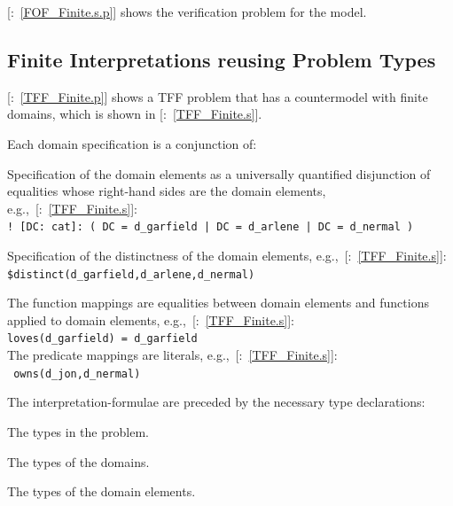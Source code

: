 \documentclass{ceurart}
\newcommand{\smalltt}[1]{\small \texttt{#1}}
\newcommand{\example}{{\scriptsize \faFile[regular]}}
\newcommand{\tildenot}{\raisebox{0.4ex}{\texttildelow}}
\newenvironment{packed_itemize}{
\vspace*{-0.3em}
\begin{itemize}
\setlength{\partopsep}{0pt}
\setlength{\itemsep}{1pt}
\setlength{\parskip}{0pt}
\setlength{\parsep}{0pt}
}{\end{itemize}}
\begin{document}
[\example{}:~\ref{FOF_Finite.s.p}] shows the verification problem for the model.

\subsection{Finite Interpretations reusing Problem Types}
\label{TarskianReusingTypes}

[\example{}:~\ref{TFF_Finite.p}] shows a TFF problem that has a countermodel with finite domains,
which is shown in [\example{}:~\ref{TFF_Finite.s}].

Each domain specification is a conjunction of:
\begin{packed_itemize}
\item Specification of the domain elements as a universally quantified disjunction of equalities 
      whose right-hand sides are the domain elements, e.g.,~[\example{}:~\ref{TFF_Finite.s}]:\\
      \hspace*{0.5cm}\smalltt{! [DC: cat]: ( DC = d\_garfield | DC = d\_arlene | DC = d\_nermal )}
\item Specification of the distinctness of the domain elements, 
e.g.,~[\example{}:~\ref{TFF_Finite.s}]:\\
      \hspace*{0.5cm}\smalltt{\$distinct(d\_garfield,d\_arlene,d\_nermal)}
\end{packed_itemize}

The function mappings are equalities between domain elements and functions applied to domain 
elements, e.g.,~[\example{}:~\ref{TFF_Finite.s}]: \\
\hspace*{0.5cm}\smalltt{loves(d\_garfield) = d\_garfield}\\
The predicate mappings are literals, e.g.,~[\example{}:~\ref{TFF_Finite.s}]: \\
\hspace*{0.5cm}\smalltt{\tildenot{}\,owns(d\_jon,d\_nermal)}

The interpretation-formulae are preceded by the necessary type declarations:
\begin{packed_itemize}
\item The types in the problem.
\item The types of the domains.
\item The types of the domain elements.
\end{packed_itemize}
\end{document}

